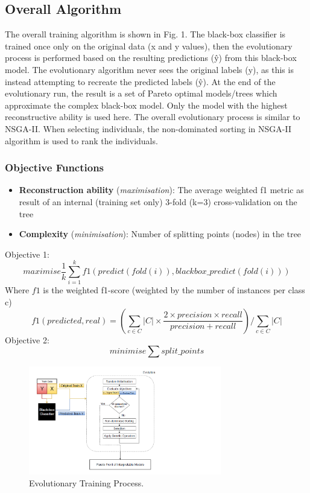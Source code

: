 \subsection{Overall Algorithm}
The overall training algorithm is shown in Fig. 1. The black-box classifier is trained once only on the original data (x and y values), then the evolutionary process is performed based on the resulting predictions (\^{y}) from this black-box model. The evolutionary algorithm never sees the original labels (y), as this is instead attempting to recreate the predicted labels (\^{y}). At the end of the evolutionary run, the result is a set of Pareto optimal models/trees which approximate the complex black-box model. Only the model with the highest reconstructive ability is used here. The overall evolutionary process is similar to NSGA-II. When selecting individuals, the non-dominated sorting in NSGA-II algorithm is used to rank the individuals.
\subsubsection{Objective Functions}
\begin{itemize}
\item \textbf{Reconstruction ability} (\textit{maximisation}): The average weighted f1 metric as result of an internal (training set only) 3-fold (k=3) cross-validation on the tree
\end{itemize}
\begin{itemize}
\item \textbf{Complexity} (\textit{minimisation}): Number of splitting points (nodes) in the tree
\end{itemize}
Objective 1:
\begin{equation} \label{eq:obj1}
maximise \frac {1}{k} \sum_{i=1}^k f1(predict(fold(i)),blackbox\_predict(fold(i)))
\end{equation}
Where $f1$ is the weighted f1-score (weighted by the number of instances per class c)
\begin{displaymath}
f1(predicted, real) = (\sum_{c\in C} |C| \times \frac{2\times precision\times recall}{precision+recall})/\sum_{c\in C} |C|
\end{displaymath}
Objective 2:
\begin{equation}
minimise \sum split\_points
\end{equation}
\begin{figure}
\includegraphics[width=0.75\textwidth]{evolution_process_resized}
\caption{Evolutionary Training Process.}
\end{figure}

